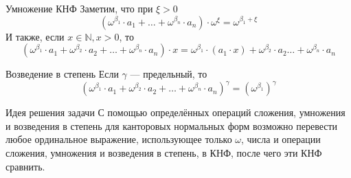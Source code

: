 \documentclass[aspectratio=169]{beamer}
\begin{document}
\begin{frame}{Умножение КНФ}
Заметим, что при $\xi > 0$ 
$$(\omega^{\beta_1}\cdot a_1 + \dots + \omega^{\beta_n}\cdot a_n) \cdot \omega^{\xi} = \omega^{\beta_1 + \xi}$$
И также, если $x\in\mathbb{N}, x > 0$, то
$$(\omega^{\beta_1}\cdot a_1 + \omega^{\beta_2}\cdot a_2 + \dots + \omega^{\beta_n}\cdot a_n) \cdot x = \omega^{\beta_1}\cdot (a_1 \cdot x) + \omega^{\beta_2}\cdot a_2\dots + \omega^{\beta_n}\cdot a_n$$
\end{frame}

\begin{frame}{Возведение в степень}
Если $\gamma$ --- предельный, то
$$(\omega^{\beta_1}\cdot a_1+\omega^{\beta_2}\cdot a_2+\dots+\omega^{\beta_n}\cdot a_n)^\gamma = (\omega^{\beta_1})^\gamma$$
\end{frame}

\begin{frame}{Идея решения задачи}
С помощью определённых операций сложения, умножения и возведения в степень для канторовых нормальных форм 
возможно перевести любое ординальное выражение, использующее только $\omega$, числа и операции сложения,
умножения и возведения в степень, в КНФ, после чего эти КНФ сравнить.
\end{frame}
\end{document}
